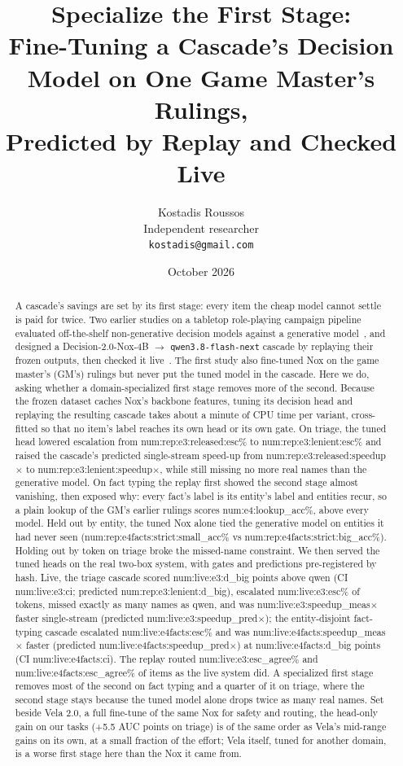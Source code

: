 \documentclass[11pt]{article}
\title{Specialize the First Stage:\\
Fine-Tuning a Cascade's Decision Model on One Game Master's Rulings,\\
Predicted by Replay and Checked Live}
\author{Kostadis Roussos\\
Independent researcher\\
\texttt{kostadis@gmail.com}}
\date{October 2026}
\newcommand{\N}[1]{\csname num:#1\endcsname}
\begin{document}
\maketitle

\begin{abstract}
A cascade's savings are set by its first stage: every item the cheap model cannot settle is paid
for twice. Two earlier studies on a tabletop role-playing campaign pipeline evaluated off-the-shelf
non-generative decision models against a generative model~\cite{companion}, and designed a
Decision-2.0-Nox-4B $\rightarrow$ \texttt{qwen3.8-flash-next} cascade by replaying their frozen
outputs, then checked it live~\cite{cascade}. The first study also fine-tuned Nox on the game
master's (GM's) rulings but never put the tuned model in the cascade. Here we do, asking whether a
domain-specialized first stage removes more of the second. Because the frozen dataset caches Nox's
backbone features, tuning its decision head and replaying the resulting cascade takes about a minute
of CPU time per variant, cross-fitted so that no item's label reaches its own head or its own gate.
On triage, the tuned head lowered escalation from \N{rep:e3:released:esc}\% to
\N{rep:e3:lenient:esc}\% and raised the cascade's predicted single-stream speed-up from
\N{rep:e3:released:speedup}$\times$ to \N{rep:e3:lenient:speedup}$\times$, while still missing no more
real names than the generative model. On fact typing the replay first showed the second stage
almost vanishing, then exposed why: every fact's label is its entity's label and entities recur, so
a plain lookup of the GM's earlier rulings scores \N{e4:lookup_acc}\%, above every model. Held out
by entity, the tuned Nox alone tied the generative model on entities it had never seen
(\N{rep:e4facts:strict:small_acc}\% vs \N{rep:e4facts:strict:big_acc}\%). Holding out by token on
triage broke the missed-name constraint. We then served the tuned heads on the real two-box
system, with gates and predictions pre-registered by hash. Live, the triage cascade scored
\N{live:e3:d_big} points above qwen (CI \N{live:e3:ci}; predicted \N{rep:e3:lenient:d_big}), escalated
\N{live:e3:esc}\% of tokens, missed exactly as many names as qwen, and was
\N{live:e3:speedup_meas}$\times$ faster single-stream (predicted \N{live:e3:speedup_pred}$\times$); the
entity-disjoint fact-typing cascade escalated \N{live:e4facts:esc}\% and was
\N{live:e4facts:speedup_meas}$\times$ faster (predicted \N{live:e4facts:speedup_pred}$\times$) at
\N{live:e4facts:d_big} points (CI \N{live:e4facts:ci}). The replay routed
\N{live:e3:esc_agree}\% and \N{live:e4facts:esc_agree}\% of items as the live system did. A
specialized first stage removes most of the second on fact typing and a quarter of it on triage,
where the second stage stays because the tuned model alone drops twice as many real names. Set
beside Vela 2.0, a full fine-tune of the same Nox for safety and routing, the head-only gain on our
tasks (+5.5 AUC points on triage) is of the same order as Vela's mid-range gains on its own, at a
small fraction of the effort; Vela itself, tuned for another domain, is a worse first stage here
than the Nox it came from.
\end{abstract}
\end{document}
